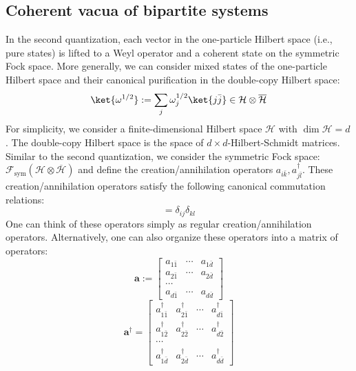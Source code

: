 \documentclass[a4paper,11pt]{article}
\theoremstyle{definition}
\numberwithin{equation}{section}
\begin{document}
\subsection{Coherent vacua of bipartite systems}\label{subsec:coherentbipartite}
In the second quantization, each vector in the one-particle Hilbert space (i.e., pure states) is lifted to a Weyl operator and a coherent state on the symmetric Fock space. More generally, we can consider mixed states of the one-particle Hilbert space and their canonical purification in the double-copy Hilbert space:
\begin{equation}
    \ket{\omega^{1/2}} := \sum_j\omega_j^{1/2}\ket{j\bar{j}}\in\mathcal{H}\otimes\overline{\mathcal{H}}
\end{equation}
For simplicity, we consider a finite-dimensional Hilbert space $\mathcal{H}$ with $\dim\mathcal{H} = d$. The double-copy Hilbert space is the space of $d\times d$-Hilbert-Schmidt matrices. Similar to the second quantization, we consider the symmetric Fock space: $\mathcal{F}_\text{sym}(\mathcal{H}\otimes\overline{\mathcal{H}})$ and define the creation/annihilation operators $a_{i\bar{k}}, a_{j\bar{l}}^\dagger$. These creation/annihilation operators satisfy the following canonical commutation relations:
\begin{equation}
    [a_{i\bar{k}},a^\dagger_{j\bar{l}}] = \delta_{ij}\delta_{kl}
\end{equation}
One can think of these operators simply as regular creation/annihilation operators. Alternatively, one can also organize these operators into a matrix of operators:
\begin{equation}
    \textbf{a} :=\begin{bmatrix}
        a_{1\bar{1}} & \cdots & a_{1\bar{d}}\\a_{2\bar{1}} &\cdots &a_{2\bar{d}}\\\cdots\\a_{d\bar{1}}&\cdots&a_{d\bar{d}}
    \end{bmatrix}
\end{equation}
\begin{equation}
    \textbf{a}^\dagger = \begin{bmatrix}
        a^\dagger_{1\bar{1}} & a^\dagger_{2\bar{1}} &\cdots & a^\dagger_{d\bar{1}}\\a^\dagger_{1\bar{2}}& a^\dagger_{2\bar{2}} & \cdots & a^\dagger_{d\bar{2}}\\\cdots\\a^\dagger_{1\bar{d}}&a^\dagger_{2\bar{d}}&\cdots&a^\dagger_{d\bar{d}}
    \end{bmatrix}
\end{equation}
\end{document}
